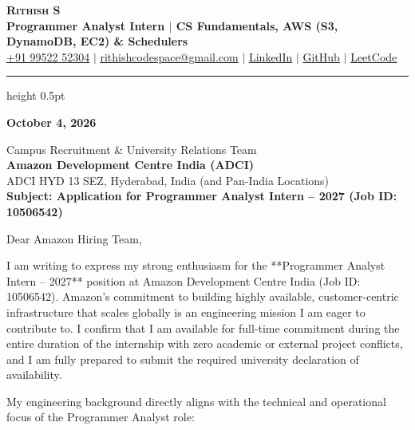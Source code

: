 \documentclass[letterpaper,11pt]{article}
\begin{document}
\begin{center}
    {\textbf{\Huge \scshape Rithish S}} \\ \vspace{3pt}
    {\small \textbf{\color{headingcolor}Programmer Analyst Intern $|$ CS Fundamentals, AWS (S3, DynamoDB, EC2) \& Schedulers}} \\ \vspace{3pt}
    \small
    \href{tel:+919952252304}{+91 99522 52304} $|$
    \href{mailto:rithishcodespace@gmail.com}{rithishcodespace@gmail.com} $|$
    \href{https://www.linkedin.com/in/rithish-saravanan-32a39431a/}{LinkedIn} $|$
    \href{https://github.com/rithishcodespace}{GitHub} $|$
    \href{https://leetcode.com/rithishcodespace}{LeetCode}
\end{center}

\vspace{-4pt}
\hrule height 0.5pt \relax
\vspace{6pt}

\textbf{October 4, 2026}

\vspace{1pt}
Campus Recruitment \& University Relations Team \\
\textbf{Amazon Development Centre India (ADCI)} \\
ADCI HYD 13 SEZ, Hyderabad, India (and Pan-India Locations) \\

\vspace{2pt}
\textbf{Subject: Application for Programmer Analyst Intern -- 2027 (Job ID: 10506542)}

\vspace{2pt}
Dear Amazon Hiring Team,

I am writing to express my strong enthusiasm for the **Programmer Analyst Intern -- 2027** position at Amazon Development Centre India (Job ID: 10506542). Amazon's commitment to building highly available, customer-centric infrastructure that scales globally is an engineering mission I am eager to contribute to. I confirm that I am available for full-time commitment during the entire duration of the internship with zero academic or external project conflicts, and I am fully prepared to submit the required university declaration of availability.

My engineering background directly aligns with the technical and operational focus of the Programmer Analyst role:
\end{document}
